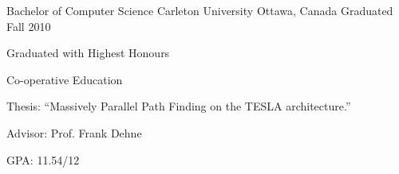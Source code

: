 


\begin{cventries}


\cventry
{Bachelor of Computer Science} %
{Carleton University} %
{Ottawa, Canada} %
{Graduated Fall 2010} %
{ %
\begin{cvitems}
  \item {Graduated with Highest Honours}
  \item {Co-operative Education}
  \item {Thesis: ``Massively Parallel Path Finding on the TESLA architecture.''}
  \item {Advisor: Prof. Frank Dehne}
  \item {GPA: 11.54/12}
\end{cvitems}
}


\end{cventries}